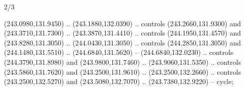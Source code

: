 \begin{flagdescription}{2/3}
\begin{scope}[xshift=0.5\flaglength,yshift=0.5\flagwidth,scale=\flagwidth/259.2]
\begin{scope}[y=0.8pt, x=0.8pt, yscale=-1,shift={(-243,-162)}]
      (243.0980,131.9450) .. (243.1880,132.0390) .. controls (243.2660,131.9300) and
      (243.3710,131.7300) .. (243.3870,131.4410) .. controls (244.1950,131.4570) and
      (243.8280,131.3050) .. (244.0430,131.3050) .. controls (244.2850,131.3050) and
      (244.1480,131.5510) .. (244.6840,131.5620) -- (244.6840,132.0230) .. controls
      (244.3790,131.8980) and (243.9800,131.7460) .. (243.9060,131.5350) .. controls
      (243.5860,131.7620) and (243.2500,131.9610) .. (243.2500,132.2660) .. controls
      (243.2500,132.5270) and (243.5080,132.7070) .. (243.7380,132.9220) -- cycle;
\end{scope}
\end{scope}
\fi
\framecode{}
\end{flagdescription}
